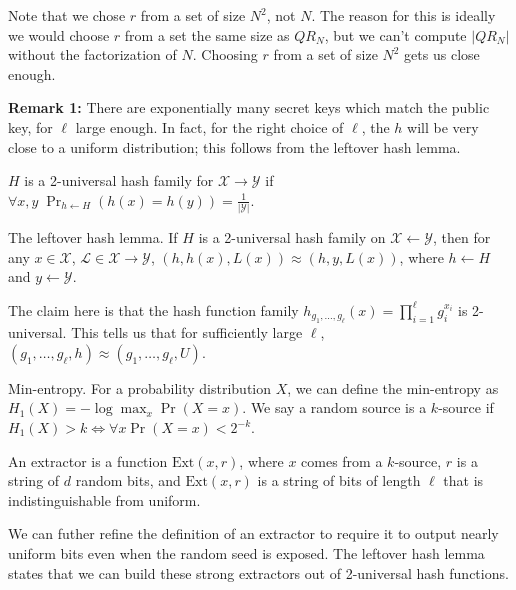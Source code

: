 \documentclass[10pt]{article}
\begin{document}
Note that we chose $r$ from a set of size $N^2$, not $N$. The reason for this is ideally we would choose $r$ from a set the same size as $QR_N$, but we can't compute $|QR_N|$ without the factorization of $N$. Choosing $r$ from a set of size $N^2$ gets us close enough.

\textbf{Remark 1:} There are exponentially many secret keys which match the public key, for $\ell$ large enough. In fact, for the right choice of $\ell$, the $h$ will be very close to a uniform distribution; this follows from the leftover hash lemma. 

\begin{definition}
$H$ is a 2-universal hash family for $\mathcal{X} \rightarrow \mathcal{Y}$ if $\forall x,y \; \Pr_{h \leftarrow H}(h(x) = h(y)) = \frac{1}{|\mathcal{Y}|}$.
\end{definition}

\begin{lemma}
The leftover hash lemma. If $H$ is a 2-universal hash family on $\mathcal{X} \leftarrow \mathcal{Y}$, then for any $x \in \mathcal{X}$, $\mathcal{L} \in \mathcal{X} \rightarrow \mathcal{Y}$, $(h,h(x),L(x)) \approx (h,y,L(x))$, where $h \leftarrow H$ and $y \leftarrow \mathcal{Y}$.
\end{lemma}

The claim here is that the hash function family $h_{g_1,\dots,g_\ell}(x) = \prod_{i=1}^\ell g_i ^ {x_i}$ is 2-universal. This tells us that for sufficiently large $\ell$, $(g_1,\dots,g_\ell,h) \approx (g_1,\dots,g_\ell,U)$.

\begin{definition}
Min-entropy. For a probability distribution $X$, we can define the min-entropy as $H_1(X) = -\log \max_x \Pr(X = x)$. We say a random source is a $k$-source if $H_1(X) > k \iff \forall x \Pr(X = x) < 2^{-k}$.
\end{definition}

\begin{definition}
An extractor is a function $\mathrm{Ext}(x,r)$, where $x$ comes from a $k$-source, $r$ is a string of $d$ random bits, and $\mathrm{Ext}(x,r)$ is a string of bits of length $\ell$ that is indistinguishable from uniform.
\end{definition}

We can futher refine the definition of an extractor to require it to output nearly uniform bits even when the random seed is exposed. The leftover hash lemma states that we can build these strong extractors out of 2-universal hash functions.
\end{document}
